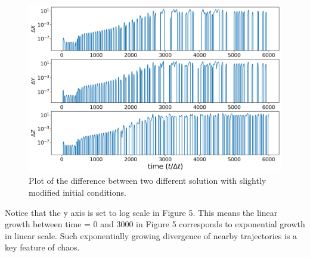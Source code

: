 \documentclass[12pt]{article}
\begin{document}
\begin{figure}[H]
    \centering
    \includegraphics[scale = 0.6]{Figure_5.png}
    \caption{Plot of the difference between two different solution with slightly modified initial conditions.}
\end{figure}

Notice that the y axis is set to log scale in Figure 5. This means the linear growth between time = 0 and 3000 in Figure 5 corresponds to exponential growth in linear scale. Such exponentially growing divergence of nearby trajectories is a key feature of chaos.
\end{document}
